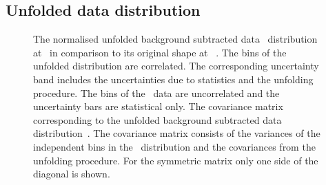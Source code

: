 \subsection{Unfolded data distribution}
%
%
%
\begin{figure}[tbp!]
\centering
{}
\hfill
{}
\caption[Unfolded \mlb\ data distribution and covariance matrix]{
%
The normalised unfolded background subtracted data \mlbr\ distribution at \truelevel\ in comparison to its original shape at \recolevel~.
%
The bins of the unfolded distribution are correlated.
%
The corresponding uncertainty band includes the uncertainties due to statistics and the unfolding procedure.
%
The bins of the \recolevel\ data are uncorrelated and the uncertainty bars are statistical only.
%
The covariance matrix corresponding to the unfolded background subtracted data distribution~.
%
The covariance matrix consists of the variances of the independent bins in the \recolevel\ distribution and the covariances from the unfolding procedure.
%
For the symmetric matrix only one side of the diagonal is shown.
%
\label{fig:unfoldclosure}
}
\end{figure}
